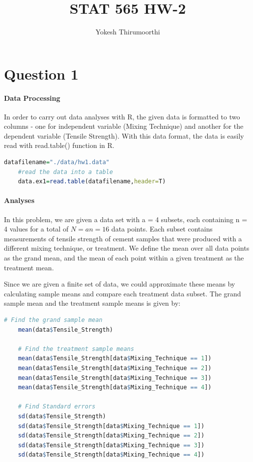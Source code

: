\documentclass[11pt]{article}
\begin{document}
\title{STAT 565 HW-2}
\author{Yokesh Thirumoorthi}

\maketitle
\pagestyle{fancy}
\fancyhf{}

\section{Question 1}

\paragraph{Data Processing}
In order to carry out data analyses with R, the given data is formatted to two columns - one for independent variable (Mixing Technique) and another for the dependent variable (Tensile Strength). With this data format, the data is easily read with read.table() function in R.

\begin{lstlisting}[language=R]
    datafilename="./data/hw1.data"
    #read the data into a table
    data.ex1=read.table(datafilename,header=T)
\end{lstlisting}

\paragraph{Analyses}
In this problem, we are given a data set with a = 4 subsets, each containing n = 4 values for a total of $\displaystyle N=an=16$ data points. 
Each subset contains measurements of tensile strength of cement samples that were produced with a different mixing technique, or treatment. We define the mean over all data points as the grand mean, and the mean of each point within a given treatment as the treatment mean.

Since we are given a finite set of data, we could approximate these means by calculating sample means and compare each treatment data subset. The grand sample mean and the treatment sample means is given by: 

\begin{lstlisting}[language=R]
    # Find the grand sample mean
    mean(data$Tensile_Strength) 

    # Find the treatment sample means
    mean(data$Tensile_Strength[data$Mixing_Technique == 1])
    mean(data$Tensile_Strength[data$Mixing_Technique == 2])
    mean(data$Tensile_Strength[data$Mixing_Technique == 3])
    mean(data$Tensile_Strength[data$Mixing_Technique == 4])
    
    # Find Standard errors
    sd(data$Tensile_Strength)
    sd(data$Tensile_Strength[data$Mixing_Technique == 1])
    sd(data$Tensile_Strength[data$Mixing_Technique == 2])
    sd(data$Tensile_Strength[data$Mixing_Technique == 3])
    sd(data$Tensile_Strength[data$Mixing_Technique == 4])

\end{lstlisting}
\end{document}

